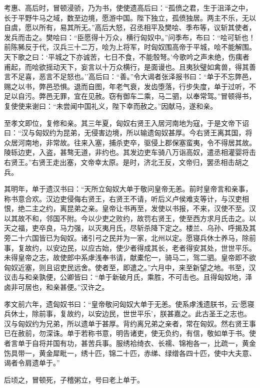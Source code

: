 \documentclass[]{article}
\begin{document}
考惠、高后时，冒顿浸骄，乃为书，使使遗高后曰：``孤偾之君，生于沮泽之中，长于平野牛马之域，数至边境，愿游中国。陛下独立，孤偾独居。两主不乐，无以自虞，愿以所有，易其所无。''高后大怒，召丞相平及樊哙、季布等，议斩其使者，发兵而击之。樊哙曰：``臣愿得十万众，横行匈奴中。''问季布，布曰：``哙可斩也！前陈豨反于代，汉兵三十二万，哙为上将军，时匈奴围高帝于平城，哙不能解围。天下歌之曰：`平城之下亦诚苦，七日不食，不能彀弩。'今歌吟之声未绝，伤痍者甫起，而哙欲摇动天下，妄言以十万众横行，是面谩也。且夷狄璧如禽兽，得其善言不足喜，恶言不足怒也。''高后曰：``善。''令大谒者张泽报书曰：``单于不忘弊邑，赐之以书，弊邑恐惧。退而自图，年老气衰，发齿堕落，行步失度，单于过听，不足以自污。弊邑无罪，宜在见赦。窃有御车二乘，马二驷，以奉常驾。''冒顿得书，复使使来谢曰：``未尝闻中国礼义，陛下幸而赦之。''因献马，遂和亲。

至孝文即位，复修和亲。其三年夏，匈奴右贤王入居河南地为寇，于是文帝下诏曰：``汉与匈奴约为昆弟，无侵害边境，所以输遗匈奴甚厚。今右贤王离其国，将众居河南地，非常故。往来入塞，捕杀吏卒，驱侵上郡保塞蛮夷，令不得居其故。陵轹边吏，入盗，甚骜无道，非约也。其发边吏车骑八万诣高奴，遣丞相灌婴将击右贤王。''右贤王走出塞，文帝幸太原。是时，济北王反，文帝归，罢丞相击胡之兵。

其明年，单于遗汉书曰：``天所立匈奴大单于敬问皇帝无恙。前时皇帝言和亲事，称书意合欢。汉边吏侵侮右贤王，右贤王不请，听后义卢侯难支等计，与汉吏相恨，绝二主之约，离昆弟之亲。皇帝让书再至，发使以书报，不来，汉使不至。汉以其故不和，邻国不附。今以少吏之败约，故罚右贤王，使至西方求月氏击之。以天之福，吏卒良，马力强，以灭夷月氏，尽斩杀降下定之。楼兰、乌孙、呼揭及其旁二十六国皆已为匈奴。诸引弓之民并为一家，北州以定。愿寝兵休士养马，除前事，复故约，以安边民，以应古始，使少者得成其长，老者得安其处，世世平乐。未得皇帝之志，故使郎中系虖浅奉书请，献橐佗一，骑马二，驾二驷。皇帝即不欲匈奴近塞，则且诏吏民远舍。使者至，即遣之。''六月中，来至新望之地。书至，汉议击与和亲孰便，公卿皆曰：``单于新破月氏，乘胜，不可击也。且得匈奴地，泽卤非可居也，和亲甚便。''汉许之。

孝文前六年，遗匈奴书曰：``皇帝敬问匈奴大单于无恙。使系虖浅遗朕书，云`愿寝兵休士，除前事，复故约，以安边民，世世平乐'，朕甚嘉之。此古圣王之志也。汉与匈奴约为兄弟，所以遗单于甚厚。背约离兄弟之亲者，常在匈奴。然右贤王事已在赦前，勿深诛。单于若称书意，明告诸吏，使无负约，有信，敬如单于书。使者言单于自将并国有功，甚苦兵事。服绣袷绮衣、长襦、锦袍各一，比疏一，黄金饬具带一，黄金犀毗一，绣十匹，锦二十匹，赤绨、绿缯各四十匹，使中大夫意、谒者令肩遗单于。''

后顷之，冒顿死，子稽粥立，号曰老上单于。
\end{document}
